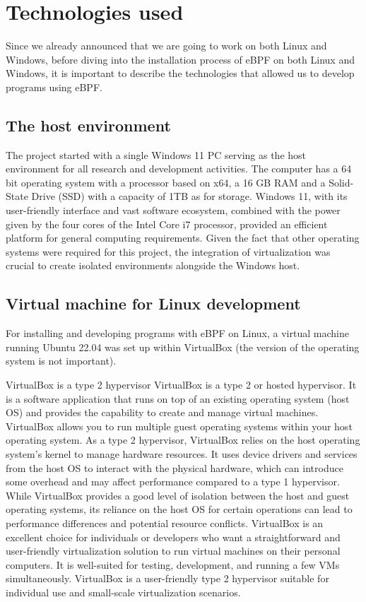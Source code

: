 \chapter{Technologies used}

Since we already announced that we are going to work on both Linux and Windows, before diving into the installation process of eBPF on both Linux and Windows, it is important to describe the technologies that allowed us to develop programs using eBPF.

\section{The host environment}

The project started with a single Windows 11 PC serving as the host environment for all research and development activities. 
The computer has a 64 bit operating system with a processor based on x64, a 16 GB RAM and a Solid-State Drive (SSD) with a capacity of 1TB as for storage.
Windows 11, with its user-friendly interface and vast software ecosystem, combined with the power given by the four cores of the Intel Core i7 processor, provided an efficient platform for general computing requirements.
Given the fact that other operating systems were required for this project, the integration of virtualization was crucial to create isolated environments alongside the Windows host.

\section{Virtual machine for Linux development}

For installing and developing programs with eBPF on Linux, a virtual machine running Ubuntu 22.04 was set up within VirtualBox (the version of the operating system is not important).

VirtualBox is a type 2 hypervisor
VirtualBox is a type 2 or hosted hypervisor. It is a software application that runs on top of an existing operating system (host OS) and provides the capability to create and manage virtual machines. VirtualBox allows you to run multiple guest operating systems within your host operating system.
As a type 2 hypervisor, VirtualBox relies on the host operating system's kernel to manage hardware resources. It uses device drivers and services from the host OS to interact with the physical hardware, which can introduce some overhead and may affect performance compared to a type 1 hypervisor.
While VirtualBox provides a good level of isolation between the host and guest operating systems, its reliance on the host OS for certain operations can lead to performance differences and potential resource conflicts.
VirtualBox is an excellent choice for individuals or developers who want a straightforward and user-friendly virtualization solution to run virtual machines on their personal computers. It is well-suited for testing, development, and running a few VMs simultaneously.
VirtualBox is a user-friendly type 2 hypervisor suitable for individual use and small-scale virtualization scenarios.

